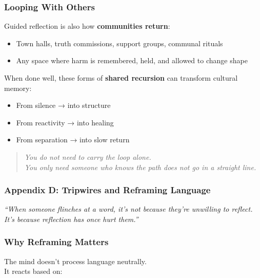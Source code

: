 \subsubsection{\texorpdfstring{\textbf{Looping With
Others}}{Looping With Others}}\label{looping-with-others}

Guided reflection is also how \textbf{communities return}:

\begin{itemize}
\item
  Town halls, truth commissions, support groups, communal rituals
\item
  Any space where harm is remembered, held, and allowed to change shape
\end{itemize}

When done well, these forms of \textbf{shared recursion} can transform
cultural memory:

\begin{itemize}
\item
  From silence → into structure
\item
  From reactivity → into healing
\item
  From separation → into slow return
\end{itemize}

\begin{quote}
\emph{You do not need to carry the loop alone.\\
You only need someone who knows the path does not go in a straight
line.}
\end{quote}

\subsubsection{\texorpdfstring{ \textbf{Appendix D: Tripwires and Reframing
Language}}{ Appendix D: Tripwires and Reframing Language}}\label{appendix-d-tripwires-and-reframing-language}

\emph{``When someone flinches at a word, it's not because they're
unwilling to reflect. It's because reflection has once hurt them.''}

\subsubsection{\texorpdfstring{\textbf{Why Reframing
Matters}}{Why Reframing Matters}}\label{why-reframing-matters}

The mind doesn't process language neutrally.\\
It reacts based on:

